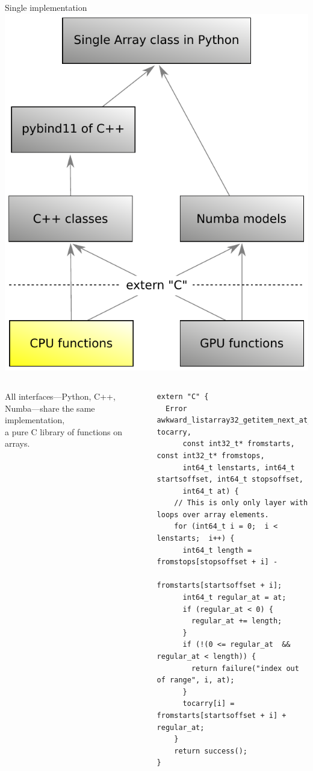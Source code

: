 \documentclass[aspectratio=169]{beamer}
\begin{document}
\begin{frame}[fragile]{Single implementation}
\large
\vspace{0.35 cm}
\hfill\mbox{\includegraphics[height=4 cm]{awkward-1-0-layers-mini-cpu.pdf}\hspace{-0.75 cm}}

\vspace{-4 cm}
\begin{columns}
All interfaces---Python, C++, Numba---share the same implementation, \\ a pure C library of functions on arrays.

\scriptsize
\begin{verbatim}
extern "C" {
  Error awkward_listarray32_getitem_next_at_64(int64_t* tocarry,
      const int32_t* fromstarts, const int32_t* fromstops,
      int64_t lenstarts, int64_t startsoffset, int64_t stopsoffset,
      int64_t at) {
    // This is only only layer with loops over array elements.
    for (int64_t i = 0;  i < lenstarts;  i++) {
      int64_t length = fromstops[stopsoffset + i] -
                       fromstarts[startsoffset + i];
      int64_t regular_at = at;
      if (regular_at < 0) {
        regular_at += length;
      }
      if (!(0 <= regular_at  &&  regular_at < length)) {
        return failure("index out of range", i, at);
      }
      tocarry[i] = fromstarts[startsoffset + i] + regular_at;
    }
    return success();
}
\end{verbatim}

\vspace{5 cm}
\end{columns}
\end{frame}
\end{document}
